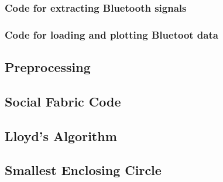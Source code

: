 \subsubsection*{Code for extracting Bluetooth signals}
\subsubsection*{Code for loading and plotting Bluetoot data}
\newpage
{}
\newpage

\subsection{Preprocessing}
\label{sec:preprocess.py}

\subsection{Social Fabric Code}
\label{sec:psych_shared.py}

\subsection{Lloyd's Algorithm}
\label{sec:lloyds.py}

\subsection{Smallest Enclosing Circle}
\label{sec:smallestenclosingcircle.py}
\newpage
